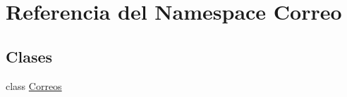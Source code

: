 \hypertarget{namespace_correo}{}\section{Referencia del Namespace Correo}
\label{namespace_correo}
\subsection*{Clases}
\begin{DoxyCompactItemize}
\item 
class \mbox{\hyperlink{class_correo_1_1_correos}{Correos}}
\end{DoxyCompactItemize}
